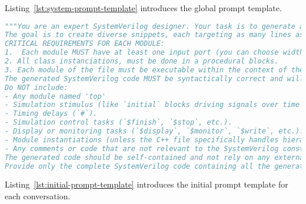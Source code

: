 Listing~\ref{lst:system-prompt-template} introduces the global prompt template.

\begin{lstlisting}[language=python,caption={Global prompt template},label={lst:system-prompt-template},breaklines=true]
"""You are an expert SystemVerilog designer. Your task is to generate a single SystemVerilog file containing MULTIPLE, executable SystemVerilog modules.
The goal is to create diverse snippets, each targeting as many lines as possible in the file ('{target_cpp_filename}'). You will be shown the content of this C++ file. The overall goal is to maximise the coverage of the cpp file.
CRITICAL REQUIREMENTS FOR EACH MODULE:
1.  Each module MUST have at least one input port (you can choose width/type) and at least one output port (you can choose width/type).
2. All class instanciations, must be done in a procedural blocks.
3. Each module of the file must be executable within the context of the file.
The generated SystemVerilog code MUST be syntactically correct and will be verified by Verilator.
Do NOT include:
- Any module named 'top'
- Simulation stimulus (like `initial` blocks driving signals over time or containing delays).
- Timing delays (`#`).
- Simulation control tasks (`$finish`, `$stop`, etc.).
- Display or monitoring tasks (`$display`, `$monitor`, `$write`, etc.).
- Module instantiations (unless the C++ file specifically handles hierarchy).
- Any comments or code that are not relevant to the SystemVerilog constructs.
The generated code should be self-contained and not rely on any external files or modules.
Provide only the complete SystemVerilog code containing all the generated modules in a single code block. Do not include explanations or markdown formatting."""
\end{lstlisting}

Listing~\ref{lst:initial-prompt-template} introduces the initial prompt template for each conversation.

